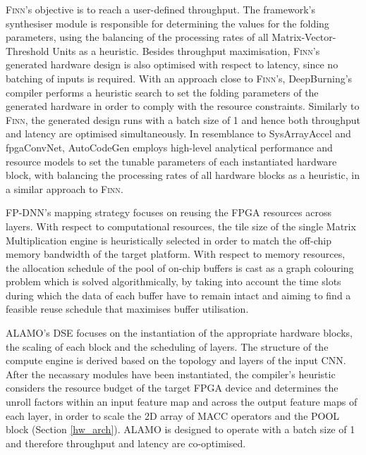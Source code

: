 \documentclass[format=acmsmall, review=false, screen=true]{acmart}
\begin{document}
\textsc{Finn}'s objective is to reach a user-defined throughput. %
The framework's synthesiser module is responsible for determining the values for the folding parameters, using the balancing of the processing rates of all Matrix-Vector-Threshold Units 
as a heuristic. Besides throughput maximisation, \textsc{Finn}'s generated hardware design is also optimised with respect to latency, since no batching of inputs is required. With an approach close to \textsc{Finn}'s, DeepBurning's compiler performs a heuristic search to set the folding parameters of the generated hardware in order to comply with the resource constraints. Similarly to \textsc{Finn}, the generated design runs with a batch size of 1 and hence both throughput and latency are optimised simultaneously. {\color{black}In resemblance to SysArrayAccel and fpgaConvNet, AutoCodeGen employs high-level analytical performance and resource models to set the tunable parameters of each instantiated hardware block, with balancing the processing rates of all hardware blocks as a heuristic, in a similar approach to \textsc{Finn}.}

FP-DNN's mapping strategy focuses on reusing the FPGA resources across layers. With respect to computational resources, the tile size of the single Matrix Multiplication engine is heuristically selected in order to match the off-chip memory bandwidth of the target platform. With respect to memory resources, the allocation schedule of the pool of on-chip buffers is cast as a graph colouring problem which is solved algorithmically, by taking into account the time slots during which the data of each buffer have to remain intact and aiming to find a feasible reuse schedule that maximises buffer utilisation.

{\color{black}ALAMO's DSE focuses on the instantiation of the appropriate hardware blocks, the scaling of each block and the scheduling of layers. The structure of the compute engine is derived based on the topology and layers of the input CNN. After the necassary modules have been instantiated, the compiler's heuristic considers the resource budget of the target FPGA device and determines the unroll factors within an input feature map and across the output feature maps of each layer, in order to scale the 2D array of MACC operators and the POOL block (Section \ref{hw_arch}). ALAMO is designed to operate with a batch size of 1 and therefore throughput and latency are co-optimised.}
\end{document}
